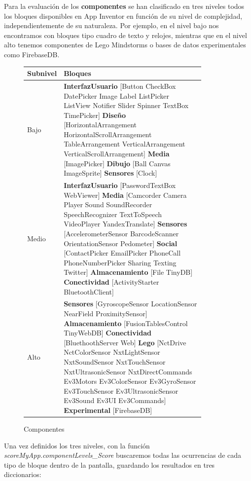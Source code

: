 \documentclass[a4paper, 12pt]{book}
\begin{document}
Para la evaluación de los \textbf{componentes} se han clasificado en tres niveles todos los bloques disponibles en App Inventor en función de su nivel de complejidad, independientemente de su naturaleza. Por ejemplo, en el nivel bajo nos encontramos con bloques tipo cuadro de texto y relojes, mientras que en el nivel alto tenemos componentes de Lego Mindstorms o bases de datos experimentales como FirebaseDB. 
\begin{figure}
	\begin{center}
	    \begin{tabular}{| l | p{0.85\linewidth} | }
	    \hline
	    \textbf{Subnivel} & \textbf{Bloques} \\ \hline
		Bajo & \textbf{InterfazUsuario} [Button CheckBox DatePicker Image Label ListPicker ListView Notifier Slider Spinner TextBox TimePicker] \textbf{Diseño} [HorizontalArrangement HorizontalScrollArrangement TableArrangement VerticalArrangement VerticalScrollArrangement] \textbf{Media} [ImagePicker] \textbf{Dibujo} [Ball Canvas ImageSprite] \textbf{Sensores} [Clock] \\ \hline
		Medio & \textbf{InterfazUsuario} [PasswordTextBox WebViewer] \textbf{Media} [Camcorder Camera Player Sound SoundRecorder SpeechRecognizer TextToSpeech VideoPlayer YandexTranslate] \textbf{Sensores} [AccelerometerSensor BarcodeScanner OrientationSensor Pedometer] \textbf{Social} [ContactPicker EmailPicker PhoneCall PhoneNumberPicker Sharing Texting Twitter] \textbf{Almacenamiento} [File TinyDB] \textbf{Conectividad} [ActivityStarter BluetoothClient]\\ \hline
		Alto & \textbf{Sensores} [GyroscopeSensor LocationSensor NearField ProximitySensor] \textbf{Almacenamiento} [FusionTablesControl TinyWebDB] \textbf{Conectividad} [BluethoothServer Web] \textbf{Lego} [NctDrive NctColorSensor NxtLightSensor NxtSoundSensor NxtTouchSensor NxtUltrasonicSensor NxtDirectCommands Ev3Motors Ev3ColorSensor Ev3GyroSensor Ev3TouchSensor Ev3UltrasonicSensor Ev3Sound Ev3UI Ev3Commands] \textbf{Experimental} [FirebaseDB]\\ \hline
            \end{tabular}
	\end{center}
	\caption{Componentes}
	\label{fig:componentsScore}
\end{figure}
Una vez definidos los tres niveles, con la función \textit{scoreMyApp.componentLevels\_Score} buscaremos todas las ocurrencias de cada tipo de bloque dentro de la pantalla, guardando los resultados en tres diccionarios:
\end{document}
